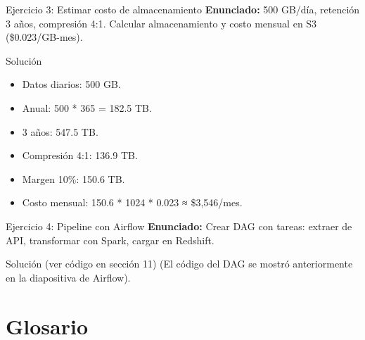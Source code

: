 \documentclass[aspectratio=169, 10pt, xcolor=table]{beamer}
\begin{document}
\begin{frame}{Ejercicio 3: Estimar costo de almacenamiento}
    \textbf{Enunciado:} 500 GB/día, retención 3 años, compresión 4:1. Calcular almacenamiento y costo mensual en S3 (\$0.023/GB-mes).
    \begin{block}{Solución}
        \begin{itemize}
            \item Datos diarios: 500 GB.
            \item Anual: 500 * 365 = 182.5 TB.
            \item 3 años: 547.5 TB.
            \item Compresión 4:1: 136.9 TB.
            \item Margen 10\%: 150.6 TB.
            \item Costo mensual: 150.6 * 1024 * 0.023 ≈ \$3,546/mes.
        \end{itemize}
    \end{block}
\end{frame}

\begin{frame}[fragile]{Ejercicio 4: Pipeline con Airflow}
    \textbf{Enunciado:} Crear DAG con tareas: extraer de API, transformar con Spark, cargar en Redshift.
    \begin{block}{Solución (ver código en sección 11)}
        (El código del DAG se mostró anteriormente en la diapositiva de Airflow).
    \end{block}
\end{frame}

\section{Glosario}
\end{document}
